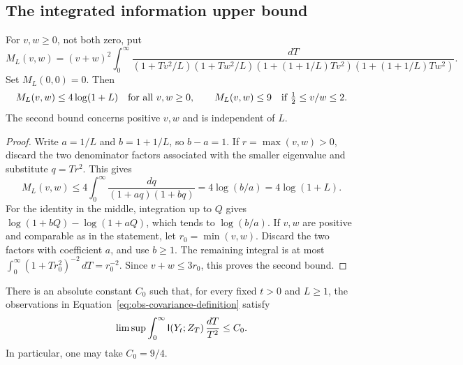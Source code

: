 \subsection{The integrated information upper bound}

\begin{lemma}
\label{lem:obs-multipliers}
For $v,w\ge0$, not both zero, put
\begin{equation}\label{eq:obs-multiplier}
 M_L(v,w)=(v+w)^2\int_0^\infty
 \frac{dT}{
 (1+Tv^2/L)(1+Tw^2/L)
 (1+(1+1/L)Tv^2)(1+(1+1/L)Tw^2)}.
\end{equation}
Set $M_L(0,0)=0$.  Then
\begin{equation}\label{eq:obs-multiplier-bounds}
 M_L(v,w)\le4\log(1+L)
 \quad\hbox{for all }v,w\ge0,
 \qquad
 M_L(v,w)\le9
 \quad\hbox{if }\tfrac12\le v/w\le2.
\end{equation}
The second bound concerns positive $v,w$ and is independent of $L$.
\end{lemma}

\begin{proof}
Write $a=1/L$ and $b=1+1/L$, so $b-a=1$.  If
$r=\max(v,w)>0$, discard the two denominator factors associated with
the smaller eigenvalue and substitute $q=Tr^2$.  This gives
\[
 M_L(v,w)\le4\int_0^\infty
 \frac{dq}{(1+aq)(1+bq)}
 =4\log(b/a)=4\log(1+L).
\]
For the identity in the middle, integration up to $Q$ gives
$\log(1+bQ)-\log(1+aQ)$, which tends to $\log(b/a)$.
If $v,w$ are positive and comparable as in the statement, let
$r_0=\min(v,w)$.  Discard the two factors with coefficient $a$, and
use $b\ge1$.  The remaining integral is at most
$\int_0^\infty(1+Tr_0^2)^{-2}\,dT=r_0^{-2}$.
Since $v+w\le3r_0$, this proves the second bound.
\end{proof}

\begin{proposition}
\label{prop:information-upper}
There is an absolute constant $C_0$ such that, for every fixed $t>0$
and $L\ge1$, the observations in
Equation~\eqref{eq:obs-covariance-definition} satisfy
\begin{equation}\label{eq:obs-information-upper}
 \limsup\int_0^\infty\mathsf I(Y_t;Z_T)\,\frac{dT}{T^2}\le C_0.
\end{equation}
In particular, one may take $C_0=9/4$.
\end{proposition}

